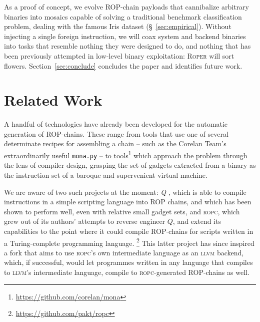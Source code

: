 As a proof of concept, we evolve ROP-chain payloads that
cannibalize arbitrary binaries into mosaics capable of solving a
traditional benchmark classification problem, dealing with
the famous Iris dataset (\S~\ref{sec:empirical}). Without
injecting a single foreign instruction, we will coax system and
backend binaries into tasks that resemble nothing they were
designed to do, and nothing that has been previously attempted in
low-level binary exploitation: \textsc{Roper} will sort
flowers. Section~\ref{sec:conclude} concludes the paper and
identifies future work.

\section{Related Work}\label{sec:RopBackgnd}






A handful of technologies have already been developed for the
automatic generation of ROP-chains. These range from
tools that use one of several determinate recipes for assembling
a chain -- such as the {Corelan Team}'s extraordinarily useful
\texttt{mona.py} -- to tools\footnote{\url{https://github.com/corelan/mona}} which approach the problem through
the lens of compiler design, grasping the set of gadgets
extracted from a binary as the instruction set of a baroque and
supervenient virtual machine. %

We are aware of two such projects at the moment:
\emph{Q} \cite{shacham07}, which is able to compile instructions in a simple scripting language into ROP chains, and which has been shown to perform well,
even with relative small gadget sets, and \textsc{ropc}, which grew out of
its authors' attempts to reverse engineer $Q$, and extend its
capabilities to the point where it could compile
ROP-chains for scripts written in a Turing-complete
programming language.%
\footnote{\url{https://github.com/pakt/ropc}} This latter project
has since inspired a fork that aims to use \textsc{ropc}'s own
intermediate language as an \textsc{llvm} backend, which, if
successful, would let programmes written in any language that
compiles to \textsc{llvm}'s intermediate language, compile to
\textsc{ropc}-generated ROP-chains as well.  


